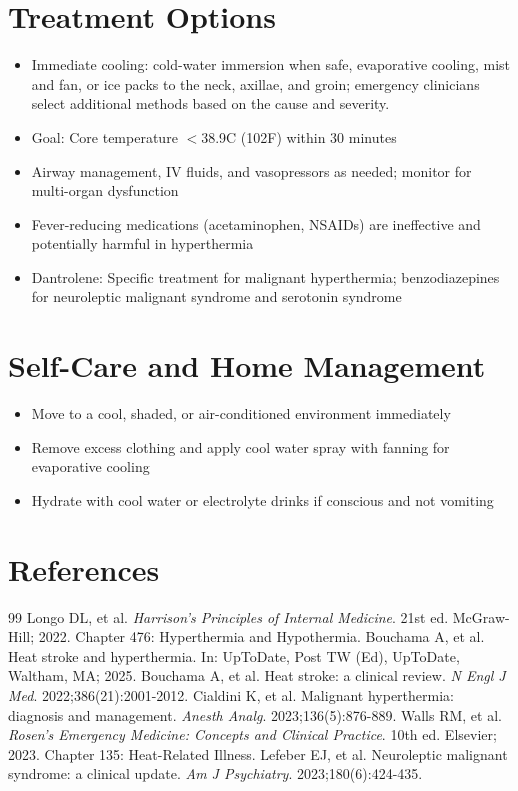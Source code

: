 \section*{Treatment Options}
\begin{itemize}
  \item Immediate cooling: cold-water immersion when safe, evaporative cooling, mist and fan, or ice packs to the neck, axillae, and groin; emergency clinicians select additional methods based on the cause and severity.
  \item Goal: Core temperature \ensuremath{<}38.9\textdegree{}C (102\textdegree{}F) within 30 minutes
  \item Airway management, IV fluids, and vasopressors as needed; monitor for multi-organ dysfunction
  \item Fever-reducing medications (acetaminophen, NSAIDs) are ineffective and potentially harmful in hyperthermia
  \item Dantrolene: Specific treatment for malignant hyperthermia; benzodiazepines for neuroleptic malignant syndrome and serotonin syndrome
\end{itemize}

\section*{Self-Care and Home Management}
\begin{itemize}
  \item Move to a cool, shaded, or air-conditioned environment immediately
  \item Remove excess clothing and apply cool water spray with fanning for evaporative cooling
  \item Hydrate with cool water or electrolyte drinks if conscious and not vomiting
\end{itemize}

\section*{References}

\begin{thebibliography}{99}
 Longo DL, et al. \emph{Harrison's Principles of Internal Medicine}. 21st ed. McGraw-Hill; 2022. Chapter 476: Hyperthermia and Hypothermia.
 Bouchama A, et al. Heat stroke and hyperthermia. In: UpToDate, Post TW (Ed), UpToDate, Waltham, MA; 2025.
 Bouchama A, et al. Heat stroke: a clinical review. \emph{N Engl J Med}. 2022;386(21):2001-2012.
 Cialdini K, et al. Malignant hyperthermia: diagnosis and management. \emph{Anesth Analg}. 2023;136(5):876-889.
 Walls RM, et al. \emph{Rosen's Emergency Medicine: Concepts and Clinical Practice}. 10th ed. Elsevier; 2023. Chapter 135: Heat-Related Illness.
 Lefeber EJ, et al. Neuroleptic malignant syndrome: a clinical update. \emph{Am J Psychiatry}. 2023;180(6):424-435.
\end{thebibliography}
